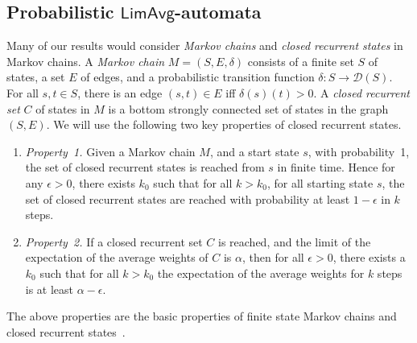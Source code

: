 \documentclass{llncs}
\newcommand{\D}{\mathcal{D}}
\newcommand{\LimAvg}{\mathsf{LimAvg}}
\begin{document}
 
\subsection{Probabilistic $\LimAvg$-automata}


Many of our results would consider \emph{Markov chains} and 
\emph{closed recurrent states} in Markov chains. 
A \emph{Markov chain} $M=(S,E,\delta)$ consists of a finite set $S$ of states,
a set $E$ of edges, and a probabilistic transition function 
$\delta:S \to \D(S)$. 
For all $s,t \in S$, there is an edge $(s,t) \in E$ iff 
$\delta(s)(t)>0$. 
A \emph{closed recurrent set} $C$ of states in $M$ is a 
bottom strongly connected set of states in the graph $(S,E)$.
We will use the following two key properties of closed recurrent states.
\begin{enumerate}
\item \emph{Property~1.} Given a Markov chain $M$, and a start state $s$, 
with probability~1, the set of closed recurrent states is reached from 
$s$ in finite time.
Hence for any $\epsilon>0$, there exists $k_0$ such that for all $k>k_0$,
for all starting state $s$, the set of closed recurrent states are 
reached with probability at least $1-\epsilon$ in $k$ steps.

\item \emph{Property~2.} 
If a closed recurrent set $C$ is reached, and the limit of  
the expectation of the average weights of $C$ is $\alpha$, 
then for all $\epsilon>0$, there exists a $k_0$ such that for all 
$k > k_0$ the expectation of the average weights for $k$ steps is 
at least $\alpha-\epsilon$.
\end{enumerate}
The above properties are the basic properties of finite state Markov 
chains and closed recurrent states~\cite{KemenyBook}.
\end{document}

